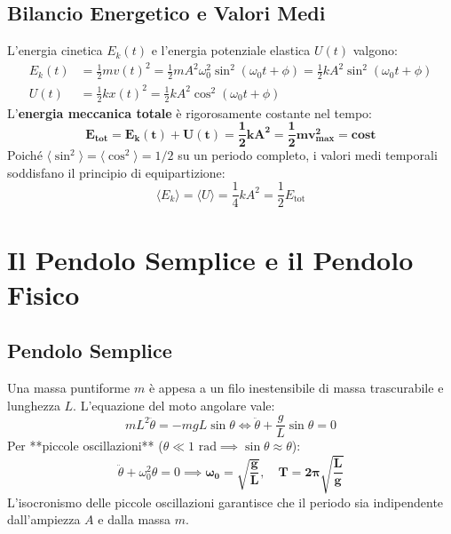 \subsection{Bilancio Energetico e Valori Medi}
L'energia cinetica $E_k(t)$ e l'energia potenziale elastica $U(t)$ valgono:
\begin{align}
    E_k(t) &= \frac{1}{2}m v(t)^2 = \frac{1}{2}m A^2\omega_0^2 \sin^2(\omega_0 t + \phi) = \frac{1}{2}k A^2 \sin^2(\omega_0 t + \phi) \\
    U(t) &= \frac{1}{2}k x(t)^2 = \frac{1}{2}k A^2 \cos^2(\omega_0 t + \phi)
\end{align}
L'\textbf{energia meccanica totale} è rigorosamente costante nel tempo:
\begin{equation}
    \mathbf{E_{\text{tot}} = E_k(t) + U(t) = \frac{1}{2}k A^2 = \frac{1}{2}m v_{\max}^2 = \text{cost}}
    \label{eq:e_tot_armonico}
\end{equation}
Poiché $\langle\sin^2\rangle = \langle\cos^2\rangle = 1/2$ su un periodo completo, i valori medi temporali soddisfano il principio di equipartizione:
\begin{equation}
    \langle E_k \rangle = \langle U \rangle = \frac{1}{4}k A^2 = \frac{1}{2}E_{\text{tot}}
\end{equation}

\section{Il Pendolo Semplice e il Pendolo Fisico}
\label{sec:pendoli}

\subsection{Pendolo Semplice}
Una massa puntiforme $m$ è appesa a un filo inestensibile di massa trascurabile e lunghezza $L$. L'equazione del moto angolare vale:
\begin{equation}
    m L^2 \ddot{\theta} = -mg L \sin\theta \iff \ddot{\theta} + \frac{g}{L}\sin\theta = 0
\end{equation}
Per **piccole oscillazioni** ($\theta \ll 1\text{ rad} \implies \sin\theta \approx \theta$):
\begin{equation}
    \ddot{\theta} + \omega_0^2 \theta = 0 \implies \mathbf{\omega_0 = \sqrt{\frac{g}{L}}, \quad T = 2\pi\sqrt{\frac{L}{g}}}
    \label{eq:pendolo_semplice}
\end{equation}
L'isocronismo delle piccole oscillazioni garantisce che il periodo sia indipendente dall'ampiezza $A$ e dalla massa $m$.

